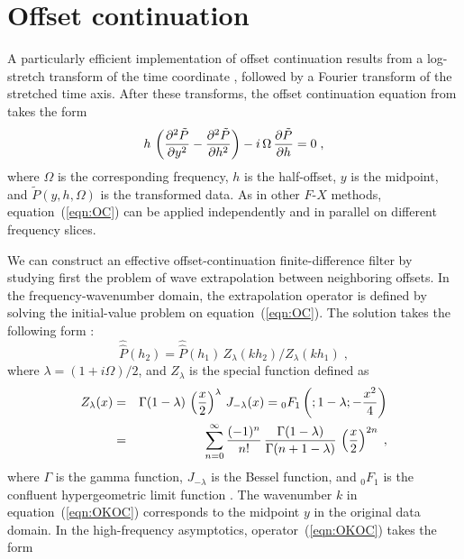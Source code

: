\section{Offset continuation}

A particularly efficient implementation of offset continuation results
from a log-stretch transform of the time coordinate
\cite[]{GPR30-06-08130828}, followed by a Fourier transform of the
stretched time axis. After these transforms, the offset continuation
equation from \cite[]{GEO68-02-07180732} takes the form
\begin{equation}
  h \, \left( {\partial^2 \tilde{P} \over \partial y^2} - 
    {\partial^2 \tilde{P} \over \partial h^2} \right) - 
  i\,\Omega \, {\partial \tilde{P} \over   {\partial h}} = 0 \;,
  \label{eqn:OC} 
\end{equation}
where $\Omega$ is the corresponding frequency, $h$ is the half-offset,
$y$ is the midpoint, and $\tilde{P} (y,h,\Omega)$ is the transformed
data. As in other $F$-$X$ methods, equation~(\ref{eqn:OC}) can be
applied independently and in parallel on different frequency slices.
\par
We can construct an effective offset-continuation finite-difference
filter by studying first the problem of wave extrapolation between
neighboring offsets. In the frequency-wavenumber domain, the
extrapolation operator is defined by solving the initial-value problem
on equation~(\ref{eqn:OC}). The solution takes the following form
\cite[]{GEO68-02-07180732}:
\begin{equation}
\widehat{\widehat{P}}(h_2) = \widehat{\widehat{P}}(h_1)\,
Z_{\lambda}(kh_2)/Z_{\lambda}(kh_1)\;,
\label{eqn:OKOC}
\end{equation}
where $\lambda = (1 + i \Omega)/2$, and $Z_\lambda$ is the special
function defined as
\begin{eqnarray}
\nonumber
Z_{\lambda}(x) & = & \Gamma(1-\lambda)\,\left(x \over 2\right)^{\lambda}\,
J_{-\lambda}(x)=
{}_0F_1\left(;1-\lambda;-\frac{x^2}{4}\right) \\
& = &
\sum_{n=0}^{\infty} {(-1)^n \over n!}\,
{\Gamma(1-\lambda) \over \Gamma(n+1-\lambda)}\,
\left(x \over 2\right)^{2n}\;,
\label{eqn:z}
\end{eqnarray}
where $\Gamma$ is the gamma function, $J_{-\lambda}$ is the Bessel
function, and ${}_0F_1$ is the confluent hypergeometric limit function
\cite[]{ab}. The wavenumber $k$ in equation~(\ref{eqn:OKOC}) corresponds
to the midpoint $y$ in the original data domain.  In the
high-frequency asymptotics, operator~(\ref{eqn:OKOC}) takes the form
